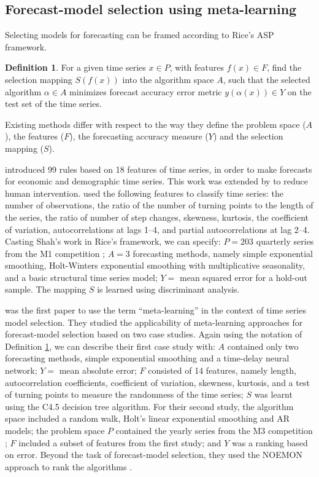 \documentclass[11pt,a4paper,]{article}
\theoremstyle{definition}
\newtheorem{definition}{Definition}[section]
\theoremstyle{definition}
\theoremstyle{definition}
\theoremstyle{remark}
\begin{document}
\subsection{Forecast-model selection using
meta-learning}\label{forecast-model-selection-using-meta-learning}

Selecting models for forecasting can be framed according to Rice's ASP
framework.

\begin{definition}
\label{def2}
For a given time series $x \in P$, with features $f(x) \in F$, find the selection mapping $S(f(x))$ into the algorithm space $A$, such that the selected algorithm $\alpha \in A$ minimizes forecast accuracy error metric $y(\alpha(x)) \in Y$ on the test set of the time series.
\end{definition}

Existing methods differ with respect to the way they define the problem
space (\(A\)), the features (\(F\)), the forecasting accuracy measure
(\(Y\)) and the selection mapping (\(S\)).

\textcite{collopy1992rule} introduced 99 rules based on 18 features of
time series, in order to make forecasts for economic and demographic
time series. This work was extended by \textcite{armstrong2001s} to
reduce human intervention. \textcite{shah1997model} used the following
features to classify time series: the number of observations, the ratio
of the number of turning points to the length of the series, the ratio
of number of step changes, skewness, kurtosis, the coefficient of
variation, autocorrelations at lags 1--4, and partial autocorrelations
at lag 2--4. Casting Shah's work in Rice's framework, we can specify:
\(P=203\) quarterly series from the M1 competition
\autocite{makridakis1982accuracy}; \(A=3\) forecasting methods, namely
simple exponential smoothing, Holt-Winters exponential smoothing with
multiplicative seasonality, and a basic structural time series model;
\(Y=\) mean squared error for a hold-out sample. The mapping \(S\) is
learned using discriminant analysis.

\textcite{prudencio2004meta} was the first paper to use the term
``meta-learning'' in the context of time series model selection. They
studied the applicability of meta-learning approaches for forecast-model
selection based on two case studies. Again using the notation of
Definition \ref{def2}, we can describe their first case study with:
\(A\) contained only two forecasting methods, simple exponential
smoothing and a time-delay neural network; \(Y=\) mean absolute error;
\(F\) consisted of 14 features, namely length, autocorrelation
coefficients, coefficient of variation, skewness, kurtosis, and a test
of turning points to measure the randomness of the time series; \(S\)
was learnt using the C4.5 decision tree algorithm. For their second
study, the algorithm space included a random walk, Holt's linear
exponential smoothing and AR models; the problem space \(P\) contained
the yearly series from the M3 competition \autocite{makridakis2000m3};
\(F\) included a subset of features from the first study; and \(Y\) was
a ranking based on error. Beyond the task of forecast-model selection,
they used the NOEMON approach to rank the algorithms
\autocite{kalousis1999noemon}.
\end{document}
